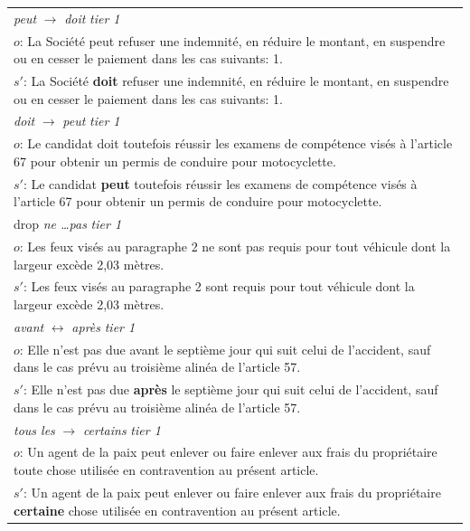 \setlength{\tabcolsep}{4pt}
\begin{tabular}{@{}p{}@{}}
\toprule
\emph{peut} $\rightarrow$ \emph{doit} \hfill \emph{tier 1} \\[1pt]
\footnotesize $o$: La Société peut refuser une indemnité, en réduire le montant, en suspendre ou en cesser le paiement dans les cas suivants: 1. \\[1pt]
\footnotesize $s'$: La Société \textbf{doit} refuser une indemnité, en réduire le montant, en suspendre ou en cesser le paiement dans les cas suivants: 1. \\
\midrule
\emph{doit} $\rightarrow$ \emph{peut} \hfill \emph{tier 1} \\[1pt]
\footnotesize $o$: Le candidat doit toutefois réussir les examens de compétence visés à l'article 67 pour obtenir un permis de conduire pour motocyclette. \\[1pt]
\footnotesize $s'$: Le candidat \textbf{peut} toutefois réussir les examens de compétence visés à l'article 67 pour obtenir un permis de conduire pour motocyclette. \\
\midrule
drop \emph{ne \dots pas} \hfill \emph{tier 1} \\[1pt]
\footnotesize $o$: Les feux visés au paragraphe 2\textdegree{} ne sont pas requis pour tout véhicule dont la largeur excède 2,03 mètres. \\[1pt]
\footnotesize $s'$: Les feux visés au paragraphe 2\textdegree{} sont requis pour tout véhicule dont la largeur excède 2,03 mètres. \\
\midrule
\emph{avant} $\leftrightarrow$ \emph{apr\`es} \hfill \emph{tier 1} \\[1pt]
\footnotesize $o$: Elle n'est pas due avant le septième jour qui suit celui de l'accident, sauf dans le cas prévu au troisième alinéa de l'article 57. \\[1pt]
\footnotesize $s'$: Elle n'est pas due \textbf{après} le septième jour qui suit celui de l'accident, sauf dans le cas prévu au troisième alinéa de l'article 57. \\
\midrule
\emph{tous les} $\rightarrow$ \emph{certains} \hfill \emph{tier 1} \\[1pt]
\footnotesize $o$: Un agent de la paix peut enlever ou faire enlever aux frais du propriétaire toute chose utilisée en contravention au présent article. \\[1pt]
\footnotesize $s'$: Un agent de la paix peut enlever ou faire enlever aux frais du propriétaire \textbf{certaine} chose utilisée en contravention au présent article. \\
\bottomrule
\end{tabular}